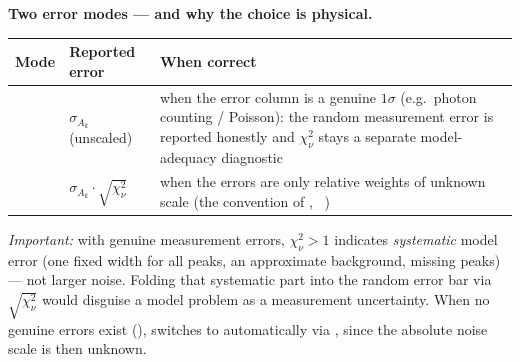 \documentclass[11pt,a4paper]{article}
\begin{document}
\smallskip
\noindent\textbf{Two error modes --- and why the choice is physical.}
\begin{table}[h]\small\centering
\begin{tabularx}{\linewidth}{@{}l l L@{}}
\toprule
\textbf{Mode} & \textbf{Reported error} & \textbf{When correct}\\
\midrule
{} & $\sigma_{A_k}$ (unscaled) &
when the error column is a genuine $1\sigma$ (e.g.\ photon counting / Poisson):
the random measurement error is reported honestly and $\chi^2_\nu$ stays a
separate model-adequacy diagnostic\\
 & $\sigma_{A_k}\cdot\sqrt{\chi^2_\nu}$ &
when the errors are only relative weights of unknown scale (the convention of
, ~\citep{SciPyCurveFit})\\
\bottomrule
\end{tabularx}
\end{table}

\noindent\textit{Important:} with genuine measurement errors, $\chi^2_\nu > 1$
indicates \emph{systematic} model error (one fixed width for all peaks, an
approximate background, missing peaks) --- not larger noise. Folding that
systematic part into the random error bar via $\sqrt{\chi^2_\nu}$ would disguise a
model problem as a measurement uncertainty. When no genuine errors exist
(),  switches to 
automatically via , since the absolute noise scale is then
unknown.

\end{document}
